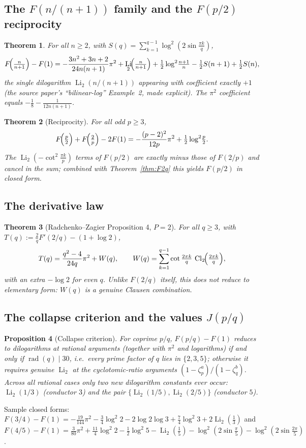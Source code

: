\documentclass[11pt]{article}
\DeclareMathOperator{\Li}{Li}
\newcommand{\Cl}{\operatorname{Cl}_2}
\newcommand{\rad}{\operatorname{rad}}
\theoremstyle{plain}\newtheorem{theorem}{Theorem}\newtheorem{proposition}[theorem]{Proposition}
\theoremstyle{remark}\newtheorem{remark}[theorem]{Remark}
\begin{document}
\subsection{The $F(n/(n+1))$ family and the $F(p/2)$ reciprocity}
\begin{theorem}\label{thm:np1}
For all $n\ge2$, with $S(q)=\sum_{k=1}^{q-1}\log^2(2\sin\tfrac{\pi k}q)$,
\[
  F\!\Bigl(\tfrac{n}{n+1}\Bigr)-F(1)=-\frac{3n^2+3n+2}{24n(n+1)}\pi^2+\Li_2\!\Bigl(\tfrac{n}{n+1}\Bigr)
  +\tfrac12\log^2\!\tfrac{n+1}{n}-\tfrac12 S(n+1)+\tfrac12 S(n),
\]
the single dilogarithm $\Li_2(n/(n+1))$ appearing with coefficient exactly $+1$ (the source paper's
``bilinear-log'' Example~2, made explicit). The $\pi^2$ coefficient equals $-\tfrac18-\tfrac1{12n(n+1)}$.
\end{theorem}
\begin{theorem}[Reciprocity]\label{thm:p2}
For all odd $p\ge3$,
\[
  F\!\Bigl(\tfrac p2\Bigr)+F\!\Bigl(\tfrac2p\Bigr)-2F(1)=-\frac{(p-2)^2}{12p}\pi^2+\tfrac12\log^2\!\tfrac p2 .
\]
The $\Li_2(-\cot^2\frac{\pi k}{p})$ terms of $F(p/2)$ are exactly minus those of $F(2/p)$ and cancel in the
sum; combined with Theorem~\ref{thm:F2q} this yields $F(p/2)$ in closed form.
\end{theorem}

\subsection{The derivative law}
\begin{theorem}[Radchenko--Zagier Proposition 4, $P=2$]\label{thm:deriv}
For all $q\ge3$, with $T(q):=\tfrac2q F'(2/q)-(1+\log2)$,
\[
  T(q)=\frac{q^2-4}{24q}\pi^2+W(q),\qquad
  W(q)=\sum_{k=1}^{q-1}\cot\tfrac{2\pi k}{q}\,\Cl\!\Bigl(\tfrac{2\pi k}q\Bigr),
\]
with an extra $-\log2$ for even $q$. Unlike $F(2/q)$ itself, this does \emph{not} reduce to elementary form:
$W(q)$ is a genuine Clausen combination.
\end{theorem}

\subsection{The collapse criterion and the values $J(p/q)$}
\begin{proposition}[Collapse criterion]\label{prop:collapse}
For coprime $p/q$, $F(p/q)-F(1)$ reduces to dilogarithms at \emph{rational} arguments (together with $\pi^2$
and logarithms) if and only if $\rad(q)\mid 30$, i.e.\ every prime factor of $q$ lies in $\{2,3,5\}$;
otherwise it requires genuine $\Li_2$ at the cyclotomic-ratio arguments $(1-\zeta_p^a)/(1-\zeta_q^b)$. Across
all rational cases only two new dilogarithm constants ever occur: $\Li_2(1/3)$ (conductor $3$) and the pair
$\{\Li_2(1/5),\Li_2(2/5)\}$ (conductor $5$).
\end{proposition}
\noindent Sample closed forms:
$F(3/4)-F(1)=-\tfrac{19}{144}\pi^2-\tfrac34\log^2 2-2\log2\log3+\tfrac74\log^2 3+2\Li_2(\tfrac13)$ and
$F(4/5)-F(1)=\tfrac{3}{80}\pi^2+\tfrac{11}4\log^2 2-\tfrac12\log^2 5-\Li_2(\tfrac15)-\log^2(2\sin\tfrac\pi5)-\log^2(2\sin\tfrac{2\pi}5)$.
\end{document}

